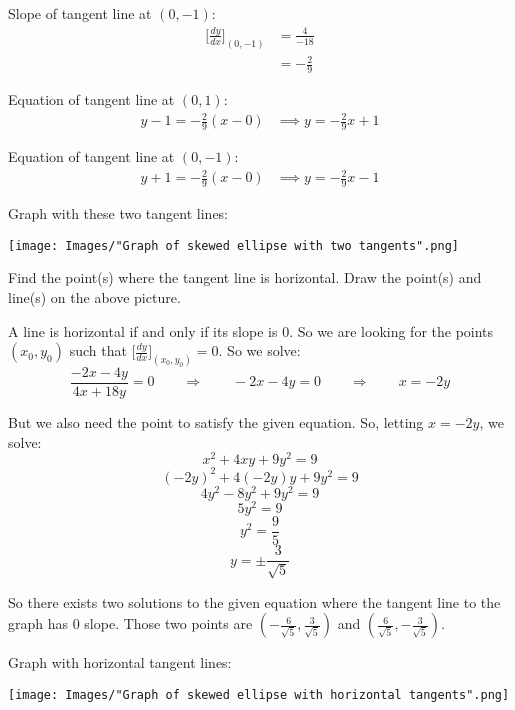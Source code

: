 \documentclass[nooutcomes]{ximera}
\renewenvironment{freeResponse}{
\ifhandout\setbox0\vbox\bgroup\else
\begin{trivlist}\item[\hskip \labelsep\bfseries Solution:\hspace{2ex}]
\fi}
{\ifhandout\egroup\else
\end{trivlist}
\fi}
\newcommand{\dd}[2][]{\frac{d #1}{d #2}}
\newcommand{\eval}[1]{\bigg[ #1 \bigg]}
\begin{document}
\begin{problem}
\begin{enumerate}
\begin{freeResponse}
        Slope of tangent line at $(0, -1)$:
        \begin{align*}
          \eval{\dd[y]{x}}_{(0,-1)} &= \frac{4}{-18}\\
                                    &= -\frac{2}{9}
        \end{align*}

        Equation of tangent line at $(0, 1)$:
        \begin{align*}
          y - 1 = -\frac{2}{9}(x-0)  &\implies y = -\frac{2}{9}x + 1 
        \end{align*}
        
        Equation of tangent line at $(0, -1)$:
        \begin{align*}
           y + 1 = -\frac{2}{9}(x-0) &\implies y = -\frac{2}{9}x - 1 
        \end{align*}

        Graph with these two tangent lines:
        \begin{image}
          \texttt{[image: Images/"Graph of skewed ellipse with two tangents".png]}
        \end{image}
      \end{freeResponse}

    \item  Find the point(s) where the tangent line is horizontal.  Draw the point(s) and line(s) on the above picture.
      \begin{freeResponse}
        A line is horizontal if and only if its slope is 0.  So we are looking for the points $(x_0,y_0)$ such that $\eval{\dd[y]{x}}_{(x_0,y_0)} = 0$.  So we solve:
	$$ \frac{-2x-4y}{4x+18y} = 0\qquad \Longrightarrow \qquad -2x - 4y = 0 \qquad \Longrightarrow \qquad x=-2y$$
		
	But we also need the point to satisfy the given equation.  So, letting $x=-2y$, we solve:
	$$x^2 + 4xy + 9y^2 = 9 $$
	$$ (-2y)^2 + 4(-2y)y + 9y^2 = 9 $$
	$$ 4y^2 - 8y^2 + 9y^2 = 9 $$
	$$ 5y^2 = 9 $$
	$$ y^2 = \frac{9}{5} $$
	$$ y = \pm \frac{3}{\sqrt{5}} $$
		
	So there exists two solutions to the given equation where the tangent line to the graph has 0 slope.  Those two points are $\left( -\frac{6}{\sqrt{5}}, \frac{3}{\sqrt{5}} \right)$ and $\left( \frac{6}{\sqrt{5}}, - \frac{3}{\sqrt{5}} \right)$.

        Graph with horizontal tangent lines:
        \begin{image}
          \texttt{[image: Images/"Graph of skewed ellipse with horizontal tangents".png]}
        \end{image}
	\end{freeResponse}
  \end{enumerate}
\end{problem}
\end{document}
